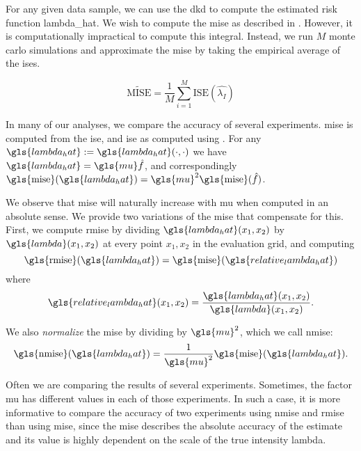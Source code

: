 For any given data sample, we can use the \gls{dkd} to compute the estimated risk function \gls{lambda_hat}.
We wish to compute the \gls{mise} as described in .
However, it is computationally impractical to compute this integral.
Instead,
we run $M$ monte carlo simulations and approximate the \gls{mise} by taking the empirical average of the \glspl{ise}.

\begin{equation}
    \label{eq:mise_tilde}
    \widetilde{\mbox{MISE}} = \frac{1}{M} \sum_{i=1}^{M} \mbox{ISE}(\hat{\lambda_I})
\end{equation}

In many of our analyses, we compare the accuracy of several experiments.
\gls{mise} is computed from the \gls{ise},
and \gls{ise} as computed using .
For any $\gls{lambda_hat} := \gls{lambda_hat}\dotdot$ we have $\gls{lambda_hat} = \gls{mu} \hat f $,
and correspondingly $ \mbox{\gls{mise}}(\gls{lambda_hat}) = \gls{mu}^2 \mbox{\gls{mise}}(\hat f) $.

We observe that \gls{mise} will naturally increase with \gls{mu} when computed in an absolute sense.
We provide two variations of the \gls{mise} that compensate for this.
First, we compute \gls{rmise} by dividing $\gls{lambda_hat}\xvec$ by $\gls{lambda}\xvec$ at every point $x_1, x_2$ in the evaluation grid, and computing
\begin{equation}
\label{eq:rmise}
    \mbox{\gls{rmise}}(\gls{lambda_hat}) = 
        \mbox{\gls{mise}}(\gls{relative_lambda_hat}) \\
\end{equation}
where
\begin{equation}
\label{eq:relative_lambda_hat}
    \gls{relative_lambda_hat}\xvec = 
        \frac{\gls{lambda_hat}\xvec}{\gls{lambda}\xvec}
        \text{.}
\end{equation}

We also \textit{normalize} the \gls{mise} by dividing by $\gls{mu}^2$,
which we call \gls{nmise}:
\begin{equation}
\label{eq:nmise}
    \mbox{\gls{nmise}}(\gls{lambda_hat}) = 
        \frac{1}{\gls{mu}^2} \mbox{\gls{mise}}(\gls{lambda_hat}) \text{.}
\end{equation}

Often we are comparing the results of several experiments.
Sometimes, the \gls{factor} \gls{mu} has different values in each of those experiments.
In such a case, it is more informative to compare the accuracy of two experiments using \gls{nmise} and \gls{rmise} than using \gls{mise},
since the \gls{mise} describes the absolute accuracy of the estimate and its value is highly dependent on the scale of the true intensity \gls{lambda}.

